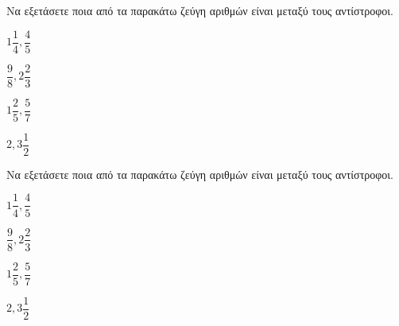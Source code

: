 Να εξετάσετε ποια από τα παρακάτω ζεύγη αριθμών είναι μεταξύ τους αντίστροφοι.
\begin{multicols}{2}
\begin{alist}
\item $ 1\dfrac{1}{4},\dfrac{4}{5} $
\item $ \dfrac{9}{8},2\dfrac{2}{3} $
\item $ 1\dfrac{2}{5},\dfrac{5}{7} $
\item $ 2,3\dfrac{1}{2} $
\end{alist}
\end{multicols}
Να εξετάσετε ποια από τα παρακάτω ζεύγη αριθμών είναι μεταξύ τους αντίστροφοι.
\begin{multicols}{2}
\begin{alist}
\item $ 1\dfrac{1}{4},\dfrac{4}{5} $
\item $ \dfrac{9}{8},2\dfrac{2}{3} $
\item $ 1\dfrac{2}{5},\dfrac{5}{7} $
\item $ 2,3\dfrac{1}{2} $
\end{alist}
\end{multicols}
